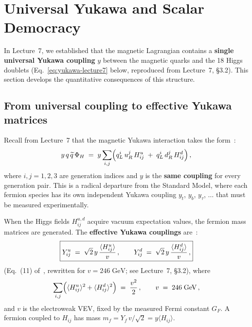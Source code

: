 \documentclass[11pt,a4paper]{article}
\begin{document}
\section{Universal Yukawa and Scalar Democracy}
\label{sec:scalar-democracy}

In Lecture~7, we established that the magnetic Lagrangian contains a
\textbf{single universal Yukawa coupling} $y$ between the magnetic
quarks and the 18 Higgs doublets
(Eq.~\eqref{eq:yukawa-lecture7} below, reproduced from Lecture~7,
\S3.2).  This section develops the quantitative consequences of this
structure.

\subsection{From universal coupling to effective Yukawa matrices}

Recall from Lecture~7 that the magnetic Yukawa interaction takes the
form~\cite{CacciapagliaSannino2024}:
\begin{equation}\label{eq:yukawa-lecture7}
  y\, q\, \widetilde{q}\, \Phi_H
  \;=\; y \sum_{i,j}
  \Bigl(
    q_L^i\, u_R^j\, H_{ij}^u
    \;+\; q_L^i\, d_R^j\, H_{ij}^d
  \Bigr)\,,
\end{equation}
where $i,j = 1,2,3$ are generation indices and $y$ is the
\textbf{same coupling} for every generation pair.  This is a radical
departure from the Standard Model, where each fermion species has its
own independent Yukawa coupling $y_t$, $y_b$, $y_\tau$, $\ldots$ that
must be measured experimentally.

When the Higgs fields $H_{ij}^{u,d}$ acquire vacuum expectation values,
the fermion mass matrices are generated.  The \textbf{effective Yukawa
couplings} are~\cite{CacciapagliaSannino2024,HillMachado2019}:
\begin{equation}\label{eq:eff-yukawa-8}
  \boxed{%
  Y_{ij}^u \;=\; \sqrt{2}\, y\, \frac{\langle H_{ij}^u \rangle}{v}\,,
  \qquad
  Y_{ij}^d \;=\; \sqrt{2}\, y\, \frac{\langle H_{ij}^d \rangle}{v}\,,}
\end{equation}
(Eq.~(11) of~\cite{CacciapagliaSannino2024}, rewritten for
$v = 246\;\text{GeV}$; see Lecture~7, \S3.2), where
\begin{equation}\label{eq:vev-sum-8}
  \sum_{i,j}
  \Bigl(
    \langle H_{ij}^u \rangle^2 + \langle H_{ij}^d \rangle^2
  \Bigr)
  \;=\; \frac{v^2}{2}\,,
  \qquad v \;=\; 246\;\text{GeV}\,,
\end{equation}
and $v$ is the electroweak VEV, fixed by the measured Fermi constant
$G_F$.  A fermion coupled to $H_{ij}$ has mass
$m_f = Y_f\, v/\sqrt{2} = y \langle H_{ij} \rangle$.
\end{document}
